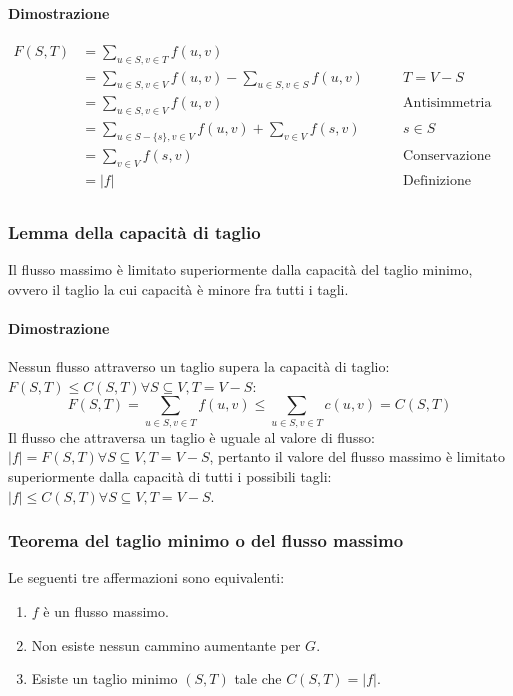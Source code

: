 \paragraph{Dimostrazione}
\begin{align*}
	F(S, T) & = \sum\limits_{u\in S, v\in T} f(u, v)\\
		& = \sum\limits_{u\in S, v\in V} f(u, v)-\sum\limits_{u\in S, v\in S} f(u, v)\quad \quad & T = V - S\\
		& = \sum\limits_{u\in S, v\in V} f(u, v) & \text{Antisimmetria}\\
		& = \sum\limits_{u\in S-\{s\}, v\in V} f(u, v)+\sum\limits_{v\in V} f(s, v) & s\in S\\
		& = \sum\limits_{v\in V} f(s, v) & \text{Conservazione flusso}\\
		& = |f| & \text{Definizione valore flusso}\\
\end{align*}
\subsubsection{Lemma della capacit\`a di taglio}
Il flusso massimo \`e limitato superiormente dalla capacit\`a del taglio minimo, ovvero il taglio la cui capacit\`a \`e minore fra tutti i tagli.
\paragraph{Dimostrazione}
Nessun flusso attraverso un taglio supera la capacit\`a di taglio: $F(S, T) \le C(S, T) \forall S\subseteq V, T = V-S$: 
$$F(S, T) = \sum\limits_{u\in S, v\in T}f(u, v)\le \sum\limits_{u\in S, v\in T} c(u, v) = C(S, T)$$
Il flusso che attraversa un taglio \`e uguale al valore di flusso: $|f|=F(S, T)\forall S\subseteq V, T = V-S$, pertanto il valore del flusso massimo \`e limitato superiormente dalla
capacit\`a di tutti i possibili tagli: $|f|\le C(S, T) \forall S\subseteq V, T = V-S$.
\subsubsection{Teorema del taglio minimo o del flusso massimo}
Le seguenti tre affermazioni sono equivalenti:
\begin{enumerate}
	\item $f$ \`e un flusso massimo.
	\item Non esiste nessun cammino aumentante per $G$.
	\item Esiste un taglio minimo $(S, T)$ tale che $C(S, T) = |f|$.
\end{enumerate}

